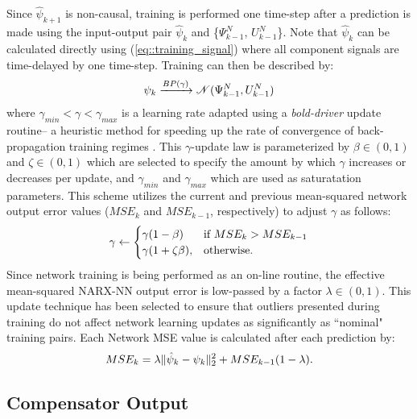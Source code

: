 Since $\hat{\psi}_{k+1}$ is non-causal, training is performed one time-step after a prediction is made using the input-output pair $\hat{\psi}_{k}$ and \{${\Psi}_{k-1}^{N}$, ${U}_{k-1}^{N}$\}. Note that $\hat{\psi}_{k}$ can be calculated directly using (\ref{eq::training_signal}) where all component signals are time-delayed by one time-step. Training can then be described by:
	\begin{equation}
		\vspace{-1mm}
		\psi_{k} \xrightarrow{BP(\gamma)} \mathscr{N}({\Psi}_{k-1}^{N},{U}_{k-1}^{N})
		\label{eq::training}
	\end{equation}
where $\gamma _{min} < \gamma < \gamma _{max}$ is a learning rate adapted using a \emph{bold-driver} update routine-- a heuristic method for speeding up the rate of convergence of back-propagation training regimes \cite{Battiti1992,Magoulas1999}. This $\gamma$-update law is parameterized by $\beta \in (0,1)$ and $\zeta \in (0,1)$ which are selected to specify the amount by which $\gamma$ increases or decreases per update, and $\gamma _{min}$ and $\gamma _{max}$ which are used as saturatation parameters. This scheme utilizes the current and previous mean-squared network output error values ($MSE_{k}$ and $MSE_{k-1}$, respectively) to adjust $\gamma$ as follows:
	\begin{equation}
		\vspace{-1mm}
	    \gamma \leftarrow 
		\begin{cases}
	    \gamma (1- \beta) 		& \text{if } MSE_{k} > MSE_{k-1}\\
	    \gamma (1+\zeta \beta),& \text{otherwise}.
		\end{cases}
	\end{equation}
Since network training is being performed as an on-line routine, the effective mean-squared NARX-NN  output error is low-passed by a factor $\lambda \in (0,1)$. This update technique has been selected to ensure that outliers presented during training do not affect network learning updates as significantly as ``nominal" training pairs. Each \kth Network MSE value is calculated after each prediction by:
	\begin{equation}
		\vspace{-1mm}
		MSE_{k} = \lambda \|\hat{\psi}_{k} - \psi_{k}\|_{2}^{2} + MSE_{k-1}(1-\lambda).
	\end{equation}


\subsection{Compensator Output}

